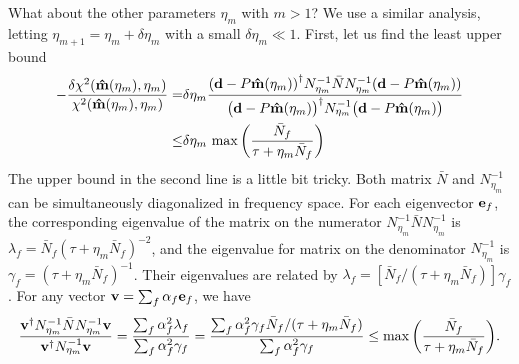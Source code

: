 \documentclass[11pt, letterpaper]{article}
\newcommand{\vbd}{\vb{d}}
\newcommand{\inv}[1]{#1^{-1}}
\newcommand{\hatm}{\vb{\hat{m}}}
\newcommand{\Nbar}{\bar{N}}
\begin{document}
What about the other parameters $\eta_m$ with $m > 1$?
We use a similar analysis,
letting $\eta_{m+1} = \eta_m + \delta \eta_m$ with a small $\delta\eta_m \ll 1$.
First, let us find the least upper bound
\begin{align}
-\frac{\delta \chi^2(\hatm(\eta_m), \eta_m)}{\chi^2(\hatm(\eta_m), \eta_m)}  
=& \delta\eta_m
\frac{\qty(\vbd - P\hatm(\eta_m))^{\dagger}
    \inv{N_{\eta_m}} \Nbar \inv{N_{\eta_m}}
    (\vbd - P\hatm(\eta_m))
}
{\qty\big(\vbd - P \hatm(\eta_m))^{\dagger}
    \inv{N_{\eta_m}}
    \qty\big(\vbd - P\hatm(\eta_m))
}
\label{dchi2 chi2}
\\
\leq & \delta \eta_m\, \max\qty(\frac{\Nbar_f}{\tau + \eta_m \Nbar_f})
\end{align}
The upper bound in the second line is a little bit tricky.
Both matrix $\Nbar$ and $\inv{N}_{\eta_m}$ 
can be simultaneously diagonalized in frequency space.
For each eigenvector $\vb{e}_f$,
the corresponding eigenvalue of the matrix on the numerator
$\inv{N}_{\eta_m} \Nbar \inv{N}_{\eta_m}$
is
$\lambda_f = \Nbar_f (\tau + \eta_m \Nbar_f)^{-2}$,
and the eigenvalue for matrix on the denominator
$\inv{N}_{\eta_m}$
is
$\gamma_f = (\tau + \eta_m \Nbar_f)^{-1}$.
Their eigenvalues are related by
$\lambda_f = [{\Nbar_f}/{(\tau + \eta_m \Nbar_f)}] \gamma_f$.
For any vector $\vb{v} = \sum_f \alpha_f \vb{e}_f$, we have
\begin{equation}
  \frac{\vb{v}^{\dagger} \inv{N}_{\eta_m} \Nbar \inv{N}_{\eta_m} \vb{v}}
{\vb{v}^{\dagger} \inv{N}_{\eta_m} \vb{v}}
= \frac{\sum_f \alpha_f^2 \lambda_f}{\sum_f \alpha_f^2 \gamma_f}
= \frac{\sum_f \alpha_f^2 \gamma_f \Nbar_f/(\tau + \eta_m \Nbar_f)}
{\sum_f \alpha_f^2 \gamma_f}
\leq \max \qty( \frac{\Nbar_f}{\tau + \eta_m \Nbar_f}).
\end{equation}
\end{document}
